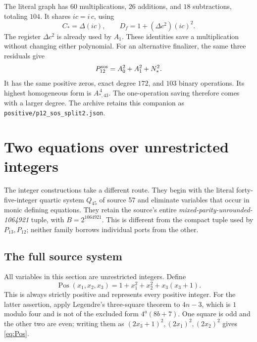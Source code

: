 \documentclass[11pt,a4paper]{article}
\theoremstyle{definition}
\theoremstyle{remark}
\newcommand{\pos}{\operatorname{Pos}}
\newcommand{\sourcepath}[1]{\texttt{\small #1}}
\begin{document}
The literal graph has \(60\) multiplications, \(26\) additions, and
\(18\) subtractions, totaling \(104\). It shares \(ic=i\,c\), using
\[
 C_*=\Delta(ic),\qquad
 D_f=1+(\Delta c^2)(ic)^2.
\]
The register \(\Delta c^2\) is already used by \(A_1\). These identities
save a multiplication without changing either polynomial.
For an alternative finalizer, the same three residuals give
\begin{equation}
 P_{12}^{\rm sos}=A_0^2+A_1^2+N_*^2.          \label{eq:P12sos}
\end{equation}
It has the same positive zeros, exact degree \(172\), and \(103\)
binary operations. Its highest homogeneous form is \(A_{*,43}^{\,4}\).
The one-operation saving therefore comes with a larger degree.
The archive retains this companion as
\sourcepath{positive/p12\_sos\_split2.json}.

\section{Two equations over unrestricted integers}
\label{sec:integer}

The integer constructions take a different route. They begin with the
literal forty-five-integer quartic system \(Q_{45}\) of source 57
\cite{quartic45} and eliminate variables that occur in monic defining
equations. They retain the source's entire
\emph{mixed-parity-unrounded-1064921} tuple, with
\(B=2^{1064921}\). This is different from the compact tuple used by
\(P_{13},P_{12}\); neither family borrows individual ports from the other.

\subsection{The full source system}

All variables in this section are unrestricted integers. Define
\begin{equation}
 \pos(x_1,x_2,x_3)=1+x_1^2+x_2^2+x_3(x_3+1).
                                                        \label{eq:Pos}
\end{equation}
This is always strictly positive and represents every positive integer.
For the latter assertion, apply Legendre's three-square theorem to
\(4n-3\), which is \(1\) modulo four and is not of the excluded form
\(4^a(8b+7)\). One square is odd and the other two are even;
writing them as \((2x_3+1)^2,(2x_1)^2,(2x_2)^2\) gives
\eqref{eq:Pos}.
\end{document}
